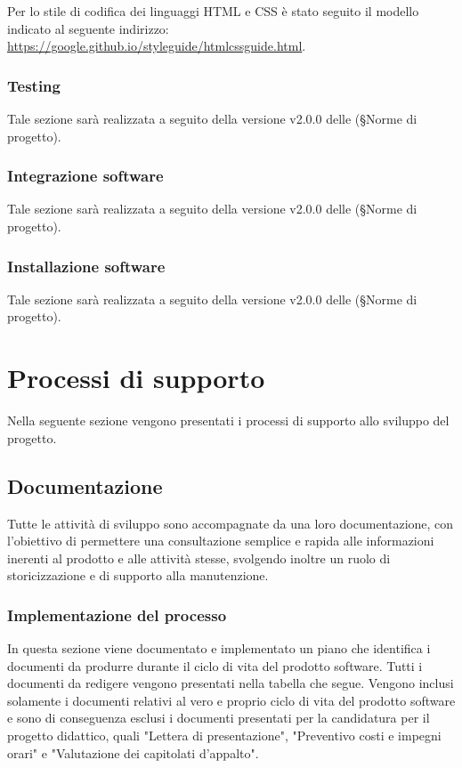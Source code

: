 \documentclass[10pt, a4paper]{article}
\begin{document}
Per lo stile di codifica dei linguaggi HTML e CSS è stato seguito il modello indicato al seguente
indirizzo: \url{https://google.github.io/styleguide/htmlcssguide.html}.

\subsubsection{Testing}
Tale sezione sarà realizzata a seguito della versione v2.0.0 delle (\S Norme di progetto).

\subsubsection{Integrazione software}
Tale sezione sarà realizzata a seguito della versione v2.0.0 delle (\S Norme di progetto).

\subsubsection{Installazione software}
Tale sezione sarà realizzata a seguito della versione v2.0.0 delle (\S Norme di progetto).

\newpage

\section{Processi di supporto}
Nella seguente sezione vengono presentati i processi di supporto allo sviluppo del progetto.

\subsection{Documentazione}
Tutte le attività di sviluppo sono accompagnate da una loro documentazione, con l'obiettivo di permettere una consultazione semplice e 
rapida alle informazioni inerenti al prodotto e alle attività stesse, svolgendo inoltre un ruolo di storicizzazione e di supporto alla 
manutenzione.

\subsubsection{Implementazione del processo}
In questa sezione viene documentato e implementato un piano che identifica i documenti da produrre durante il ciclo di vita del prodotto 
software. Tutti i documenti da redigere vengono presentati nella tabella che segue. Vengono inclusi solamente i documenti relativi al vero e
 proprio ciclo di vita del prodotto software e sono di conseguenza esclusi i documenti presentati per la candidatura per il progetto 
 didattico, quali "Lettera di presentazione", "Preventivo costi e impegni orari" e "Valutazione dei capitolati d'appalto".
\end{document}
